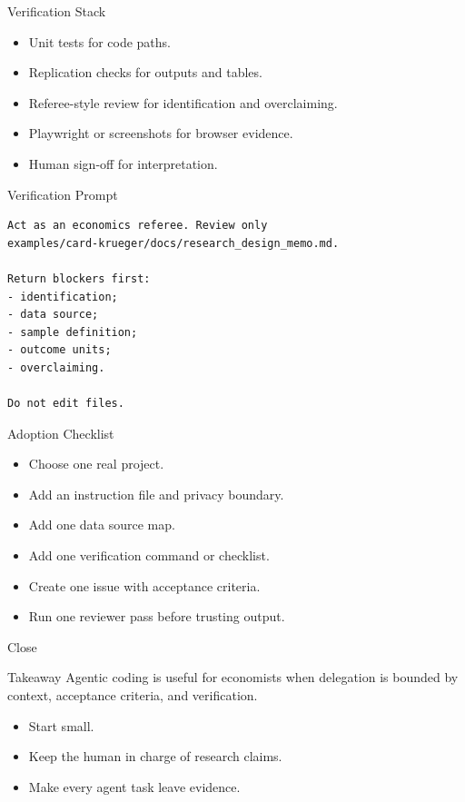 \begin{frame}{Verification Stack}
  \begin{itemize}
    \item Unit tests for code paths.
    \item Replication checks for outputs and tables.
    \item Referee-style review for identification and overclaiming.
    \item Playwright or screenshots for browser evidence.
    \item Human sign-off for interpretation.
  \end{itemize}
\end{frame}

\begin{frame}[fragile]{Verification Prompt}
  \begin{lstlisting}[style=markdown]
Act as an economics referee. Review only
examples/card-krueger/docs/research_design_memo.md.

Return blockers first:
- identification;
- data source;
- sample definition;
- outcome units;
- overclaiming.

Do not edit files.
  \end{lstlisting}
\end{frame}

\begin{frame}{Adoption Checklist}
  \begin{itemize}
    \item Choose one real project.
    \item Add an instruction file and privacy boundary.
    \item Add one data source map.
    \item Add one verification command or checklist.
    \item Create one issue with acceptance criteria.
    \item Run one reviewer pass before trusting output.
  \end{itemize}
\end{frame}

\begin{frame}{Close}
  \begin{block}{Takeaway}
    Agentic coding is useful for economists when delegation is bounded by
    context, acceptance criteria, and verification.
  \end{block}
  \begin{itemize}
    \item Start small.
    \item Keep the human in charge of research claims.
    \item Make every agent task leave evidence.
  \end{itemize}
\end{frame}


